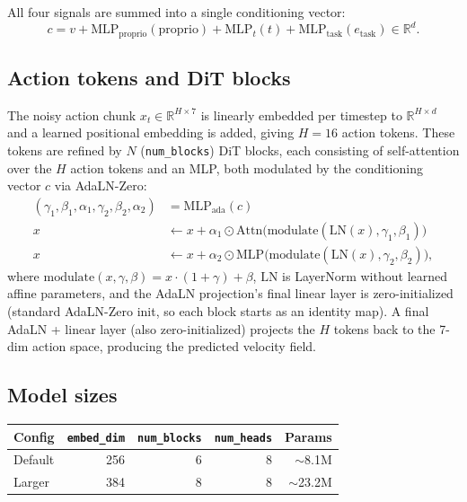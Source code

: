 \documentclass[11pt]{article}
\begin{document}
All four signals are summed into a single conditioning vector:
\begin{equation}
    c = v + \text{MLP}_{\text{proprio}}(\text{proprio}) + \text{MLP}_{t}(t) +
        \text{MLP}_{\text{task}}(e_{\text{task}}) \in \mathbb{R}^d.
\end{equation}

\subsection{Action tokens and DiT blocks}

The noisy action chunk $x_t \in \mathbb{R}^{H \times 7}$ is linearly embedded per timestep to
$\mathbb{R}^{H \times d}$ and a learned positional embedding is added, giving $H = 16$ action
tokens. These tokens are refined by $N$ (\texttt{num\_blocks}) DiT blocks, each consisting of
self-attention over the $H$ action tokens and an MLP, both modulated by the conditioning vector
$c$ via AdaLN-Zero:
\begin{align}
    (\gamma_1, \beta_1, \alpha_1, \gamma_2, \beta_2, \alpha_2) &= \text{MLP}_{\text{ada}}(c) \\
    x &\leftarrow x + \alpha_1 \odot \text{Attn}\big(\text{modulate}(\text{LN}(x), \gamma_1, \beta_1)\big) \\
    x &\leftarrow x + \alpha_2 \odot \text{MLP}\big(\text{modulate}(\text{LN}(x), \gamma_2, \beta_2)\big),
\end{align}
where $\text{modulate}(x, \gamma, \beta) = x \cdot (1 + \gamma) + \beta$, $\text{LN}$ is
LayerNorm without learned affine parameters, and the AdaLN projection's final linear layer is
zero-initialized (standard AdaLN-Zero init, so each block starts as an identity map). A final
AdaLN + linear layer (also zero-initialized) projects the $H$ tokens back to the 7-dim action
space, producing the predicted velocity field.

\subsection{Model sizes}

\begin{center}
\begin{tabular}{lrrrr}
\toprule
Config & \texttt{embed\_dim} & \texttt{num\_blocks} & \texttt{num\_heads} & Params \\
\midrule
Default & 256 & 6 & 8 & $\sim$8.1M \\
Larger  & 384 & 8 & 8 & $\sim$23.2M \\
\bottomrule
\end{tabular}
\end{center}
\end{document}
